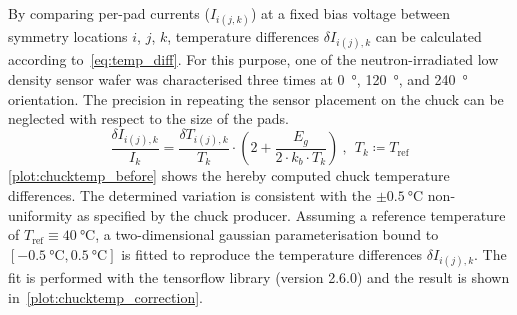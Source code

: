 By comparing per-pad currents ($I_{i(j,k)}$) at a fixed bias voltage between symmetry locations $i$, $j$, $k$, temperature differences $\delta I_{i(j), k}$ can be calculated according to~\ref{eq:temp_diff}.
For this purpose, one of the neutron-irradiated low density sensor wafer was characterised three times at \SI{0}{\degree}, \SI{120}{\degree}, and \SI{240}{\degree} orientation.
The precision in repeating the sensor placement on the chuck can be neglected with respect to the size of the pads. 
\begin{equation}
    \frac{\delta I_{i(j),k}}{I_k} = \frac{\delta T_{i(j), k}}{T_k} \cdot \left(2 + \frac{E_g}{2\cdot k_b \cdot T_k} \right)~,~~T_k \coloneqq T_\text{ref}
    \label{eq:temp_diff}
\end{equation}
\ref{plot:chucktemp_before} shows the hereby computed chuck temperature differences.
The determined variation is consistent with the $\pm\SI{0.5}{\celsius}$ non-uniformity as specified by the chuck producer.
Assuming a reference temperature of $T_\text{ref}\equiv\SI{40}{\celsius}$, a two-dimensional gaussian parameterisation bound to $[\SI{-0.5}{\celsius}, \SI{0.5}{\celsius}]$ is fitted to reproduce the temperature differences $\delta I_{i(j),k}$.
The fit is performed with the tensorflow library (version 2.6.0) and the result is shown in~\ref{plot:chucktemp_correction}.
